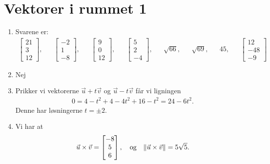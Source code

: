 \section{Vektorer i rummet 1}
\begin{enumerate}
	\item Svarene er:
	\begin{align*}
	\begin{bmatrix}
	21\\3\\12
	\end{bmatrix},&&\begin{bmatrix}
	-2\\1\\-8
	\end{bmatrix},&&\begin{bmatrix}
	9\\0\\12
	\end{bmatrix},&&\begin{bmatrix}
	5\\2\\-4
	\end{bmatrix},&&\sqrt{66},&&\sqrt{69},&&45,&& \begin{bmatrix}
	12\\-48\\-9
	\end{bmatrix}
	\end{align*}
	
	\item Nej
	
	\item Prikker vi vektorerne $\vec{u}+t\vec{v}$ og $\vec{u}-t\vec{v}$ får vi ligningen
	\begin{align*}
	0=4-t^2+4-4t^2+16-t^2=24-6t^2.
	\end{align*}
	Denne har løsningerne $t=\pm 2$.
	
	\item Vi har at
	\begin{align*}
	\vec{u}\times \vec{v}=\begin{bmatrix}
	-8\\5\\6
	\end{bmatrix},\quad \textup{og}\quad \Vert \vec{u}\times \vec{v}\Vert=5\sqrt{5}.
	\end{align*}


\end{enumerate}
